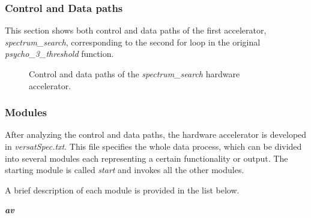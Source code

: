 \subsubsection{Control and Data paths}
This section shows both control and data paths of the first accelerator, \textit{spectrum\_search}, corresponding to the second for loop in the original \textit{psycho\_3\_threshold} function.

\begin{figure}[H]
\centerline{}
\caption{Control and data paths of the \textit{spectrum\_search} hardware accelerator.}
\label{data1}
\end{figure}

\subsubsection{Modules}
After analyzing the control and data paths, the hardware accelerator is developed in \textit{versatSpec.txt}. This file specifies the whole data process, which can be divided into several modules each representing a certain functionality or output. The starting module is called \textit{start} and invokes all the other modules.

A brief description of each module is provided in the list below.

\vspace{0.5cm}

\textit{\textbf{av}}

